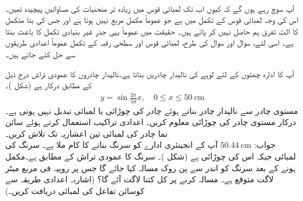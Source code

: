 \\
آپ سوچ رہے ہوں گے کہ کیوں اب تک لمبائی قوس میں زیادہ تر منحنیات کی مساواتیں پیچیدہ تھیں۔ اس کی وجہ لمبائی قوس کے تکمل میں  ہے جو عموماً مکمل مربع نہیں ہوتا ہے اور جس کی بنا متکمل کا الٹ تفرق ہم حاصل نہیں کر پاتے ہیں۔ حقیقت میں عموماً یہی جذر غیر بنیادی تکمل کا باعث بنتا ہے۔ اسی لئے، سوال  اور سوال   کی طرح،  لمبائی قوس اور سطحی رقبہ کے تکمل  عموماً اعدادی طریقوں سے حل کئے جاتے ہیں۔ 

آپ کا ادارہ چھتوں کے لئے لوہے کی  نالیدار چادریں بناتا ہے۔نالیدار چادروں کا عمودی تراش درج ذیل کے مطابق درکار ہے (شکل )۔
\begin{align*}
y=\sin\frac{3\pi}{50}x,\quad0\le x\le \SI{50}{\centi\meter}
\end{align*}
مستوی چادر سے نالیدار چادر بناتے ہوئے چادر کی چوڑائی یا لمبائی تبدیل نہیں ہوتی ہے۔ درکار مستوی چادر کی چوڑائی معلوم کریں۔ اعدادی تراکیب استعمال کرتے ہوئے سائن نما چادر کی  لمبائی تین اعشاریہ تک تلاش کریں۔\\
جواب:\quad
$\SI{50.44}{\centi\meter}$ 
آپ کے انجینئری ادارے کو سرنگ بنانے کا کام ملا ہے۔ سرنگ کی لمبائی  جبکہ اس کی چوڑائی  ہے (شکل )۔ سرنگ کا عمودی تراش  کے مطابق ہے۔مکمل ہونے کے بعد سرنگ کو اندر سے  پن روک مسالہ کیا جائے گا جس پر  روپیہ فی مربع میٹر لاگت متوقع ہے۔ مسالہ کرنے پر کل کتنا لاگت آئے گا؟ (اشارہ۔ اعدادی طریقہ سے کوسائن تفاعل کی لمبائی دریافت کریں۔)

